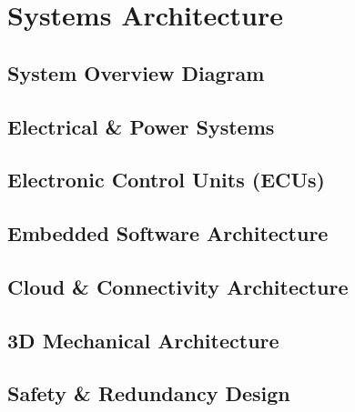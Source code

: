 \section{Systems Architecture}

\subsection{System Overview Diagram}

\subsection{Electrical \& Power Systems}

\subsection{Electronic Control Units (ECUs)}

\subsection{Embedded Software Architecture}

\subsection{Cloud \& Connectivity Architecture}

\subsection{3D Mechanical Architecture}

\subsection{Safety \& Redundancy Design}
